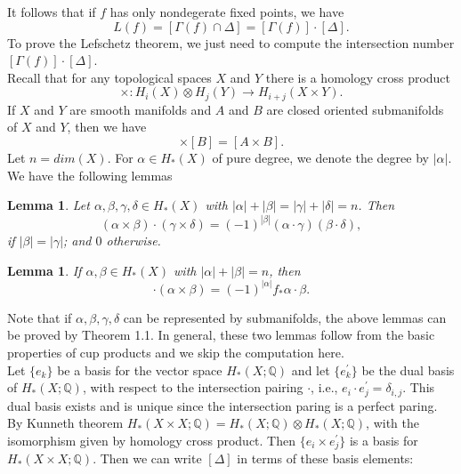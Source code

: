 \documentclass[psamsfonts]{amsart}
\newtheorem{lem}[theorem]{Lemma}
\theoremstyle{definition}
\theoremstyle{remark}
\numberwithin{equation}{section}
\begin{document}
		It follows that if $f$ has only nondegerate fixed points, we have
		\begin{equation}
			L(f) = [\Gamma(f) \cap \Delta] = [\Gamma(f)] \cdot [\Delta].
		\end{equation}
		To prove the Lefschetz theorem, we just need to compute the intersection number $[\Gamma(f)] \cdot [\Delta]$.\\
		\indent Recall that for any topological spaces $X$ and $Y$ there is a homology cross product
		\begin{equation}
			\times : H_i(X) \otimes H_j(Y) \to H_{i+j}(X \times Y).
		\end{equation}
		If $X$ and $Y$ are smooth manifolds and $A$ and $B$ are closed oriented submanifolds of $X$ and $Y$, then we have 
		\begin{equation}
			[A] \times [B] = [A \times B].
		\end{equation}
		Let $n = dim(X)$. For $\alpha \in H_*(X)$ of pure degree, we denote the degree by $|\alpha|$. We have the following lemmas
		\begin{lem}
			Let $\alpha, \beta, \gamma, \delta \in H_*(X)$ with $|\alpha|+|\beta|=|\gamma|+|\delta| = n$. Then
			\begin{equation}
				(\alpha \times \beta)\cdot (\gamma \times \delta) = (-1)^{|\beta|} (\alpha \cdot \gamma)(\beta \cdot \delta),
			\end{equation}
			if $|\beta| = |\gamma|$; and $0$ otherwise.
		\end{lem}
		\begin{lem}
			If $\alpha , \beta \in H_*(X)$ with $|\alpha|+|\beta| = n$, then
			\begin{equation}
				[\Gamma(f)]\cdot (\alpha \times \beta) = (-1)^{|\alpha|}f_*\alpha \cdot \beta.
			\end{equation}
		\end{lem}
		Note that if $\alpha, \beta, \gamma, \delta$ can be represented by submanifolds, the above lemmas can be proved by Theorem 1.1. In general, these two lemmas follow from the basic properties of cup products and we skip the computation here.\\
		\indent Let $\{ e_k \}$ be a basis for the vector space $H_*(X;\mathbb{Q})$ and let $\{ e_k ^\prime \}$ be the dual basis of $H_*(X;\mathbb{Q})$, with respect to the intersection pairing $\cdot$, i.e., $e_i \cdot e_j^\prime = \delta_{i,j}$. This dual basis exists and is unique since the intersection paring is a perfect paring.\\
		\indent By Kunneth theorem $H_*(X \times X; \mathbb{Q}) = H_*(X;\mathbb{Q}) \otimes H_*(X;\mathbb{Q})$, with the isomorphism given by homology cross product. Then $\{ e_i \times e_j^\prime \}$ is a basis for $H_*(X \times X; \mathbb{Q})$. Then we can write $[\Delta]$ in terms of these basis elements:
\end{document}
